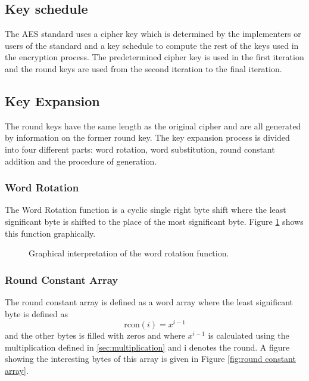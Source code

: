 \documentclass[report.tex]{subfiles}
\begin{document}
\subsection{Key schedule} \label{key schedule}

The AES standard uses a cipher key which is determined by the implementers or users of the standard and a key schedule to compute the rest of the keys used in the encryption process. %
The predetermined cipher key is used in the first iteration and the round keys are used from the second iteration to the final iteration.

\subsection{Key Expansion}
The round keys have the same length as the original cipher and are all generated by information on the former round key. The key expansion process is divided into four different parts: word rotation, word substitution, round constant addition and the procedure of generation.

\subsubsection{Word Rotation}
The Word Rotation function is a cyclic single right byte shift where the least significant byte is shifted to the place of the most significant byte. Figure \ref{fig:word shift} shows this function graphically.

\begin{figure}[ht]
\setlength{\unitlength}{1.0cm}
	\begin{center}
	\end{center}
	\caption{Graphical interpretation of the word rotation function.}
	\label{fig:word shift}
\end{figure}

\subsubsection{Round Constant Array}
The round constant array is defined as a word array where the least significant byte is defined as
\begin{equation}
	\textrm{rcon}\left(i\right) = x^{i - 1}
\end{equation}
and the other bytes is filled with zeros and where $x^{i - 1}$ is calculated using the multiplication defined in  \ref{sec:multiplication} and i denotes the round. A figure showing the interesting bytes of this array is given in Figure \ref{fig:round constant array}.
\end{document}

